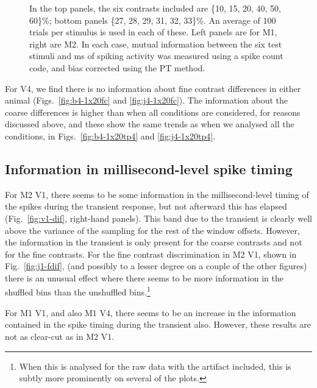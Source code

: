 \begin{figure}[htbp]
{%
In the top panels, the six contrasts included are \{10, 15, 20, 40, 50, 60\}\%; bottom panels \{27, 28, 29, 31, 32, 33\}\%. An average of 100 trials per stimulus is used in each of these.
Left panels are for M1, right are M2.
In each case, mutual information between the six test stimuli and \unit[20]{ms} of spiking activity was measured using a spike count code, and bias corrected using the PT method.
}
    \label{fig:v4-fvc}
\end{figure}

For V4, we find there is no information about fine contrast differences in either animal (Figs.~\ref{fig:b4-1x20fc} and \ref{fig:j4-1x20fc}). The information about the coarse differences is higher than when all conditions are considered, for reasons discussed above, and these show the same trends as when we analysed all the conditions, in Figs.~\ref{fig:b4-1x20tp4} and \ref{fig:j4-1x20tp4}.

\FloatBarrier
\subsection{Information in millisecond-level spike timing}

For M2 V1, there seems to be some information in the millisecond-level timing of the spikes during the transient response, but not afterward this has elapsed (Fig.~\ref{fig:v1-dif}, right-hand panels). This band due to the transient is clearly well above the variance of the sampling for the rest of the window offsets.
However, the information in the transient is only present for the coarse contrasts and not for the fine contrasts.
For the fine contrast discrimination in M2 V1, shown in Fig.~\ref{fig:j1-fdif}, (and possibly to a lesser degree on a couple of the other figures) there is an unusual effect where there seems to be more information in the shuffled bins than the unshuffled bins.\footnote{When this is analysed for the raw data with the artifact included, this is subtly more prominently on several of the plots.}

For M1 V1, and also M1 V4, there seems to be an increase in the information contained in the spike timing during the transient also. However, these results are not as clear-cut as in M2 V1.

